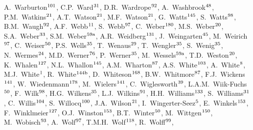 \begin{flushleft}
A.~Warburton$^\textrm{\scriptsize 101}$,    
C.P.~Ward$^\textrm{\scriptsize 31}$,    
D.R.~Wardrope$^\textrm{\scriptsize 92}$,    
A.~Washbrook$^\textrm{\scriptsize 48}$,    
P.M.~Watkins$^\textrm{\scriptsize 21}$,    
A.T.~Watson$^\textrm{\scriptsize 21}$,    
M.F.~Watson$^\textrm{\scriptsize 21}$,    
G.~Watts$^\textrm{\scriptsize 145}$,    
S.~Watts$^\textrm{\scriptsize 98}$,    
B.M.~Waugh$^\textrm{\scriptsize 92}$,    
A.F.~Webb$^\textrm{\scriptsize 11}$,    
S.~Webb$^\textrm{\scriptsize 97}$,    
C.~Weber$^\textrm{\scriptsize 180}$,    
M.S.~Weber$^\textrm{\scriptsize 20}$,    
S.A.~Weber$^\textrm{\scriptsize 33}$,    
S.M.~Weber$^\textrm{\scriptsize 59a}$,    
A.R.~Weidberg$^\textrm{\scriptsize 131}$,    
J.~Weingarten$^\textrm{\scriptsize 45}$,    
M.~Weirich$^\textrm{\scriptsize 97}$,    
C.~Weiser$^\textrm{\scriptsize 50}$,    
P.S.~Wells$^\textrm{\scriptsize 35}$,    
T.~Wenaus$^\textrm{\scriptsize 29}$,    
T.~Wengler$^\textrm{\scriptsize 35}$,    
S.~Wenig$^\textrm{\scriptsize 35}$,    
N.~Wermes$^\textrm{\scriptsize 24}$,    
M.D.~Werner$^\textrm{\scriptsize 76}$,    
P.~Werner$^\textrm{\scriptsize 35}$,    
M.~Wessels$^\textrm{\scriptsize 59a}$,    
T.D.~Weston$^\textrm{\scriptsize 20}$,    
K.~Whalen$^\textrm{\scriptsize 127}$,    
N.L.~Whallon$^\textrm{\scriptsize 145}$,    
A.M.~Wharton$^\textrm{\scriptsize 87}$,    
A.S.~White$^\textrm{\scriptsize 103}$,    
A.~White$^\textrm{\scriptsize 8}$,    
M.J.~White$^\textrm{\scriptsize 1}$,    
R.~White$^\textrm{\scriptsize 144b}$,    
D.~Whiteson$^\textrm{\scriptsize 168}$,    
B.W.~Whitmore$^\textrm{\scriptsize 87}$,    
F.J.~Wickens$^\textrm{\scriptsize 141}$,    
W.~Wiedenmann$^\textrm{\scriptsize 178}$,    
M.~Wielers$^\textrm{\scriptsize 141}$,    
C.~Wiglesworth$^\textrm{\scriptsize 39}$,    
L.A.M.~Wiik-Fuchs$^\textrm{\scriptsize 50}$,    
F.~Wilk$^\textrm{\scriptsize 98}$,    
H.G.~Wilkens$^\textrm{\scriptsize 35}$,    
L.J.~Wilkins$^\textrm{\scriptsize 91}$,    
H.H.~Williams$^\textrm{\scriptsize 133}$,    
S.~Williams$^\textrm{\scriptsize 31}$,    
C.~Willis$^\textrm{\scriptsize 104}$,    
S.~Willocq$^\textrm{\scriptsize 100}$,    
J.A.~Wilson$^\textrm{\scriptsize 21}$,    
I.~Wingerter-Seez$^\textrm{\scriptsize 5}$,    
E.~Winkels$^\textrm{\scriptsize 153}$,    
F.~Winklmeier$^\textrm{\scriptsize 127}$,    
O.J.~Winston$^\textrm{\scriptsize 153}$,    
B.T.~Winter$^\textrm{\scriptsize 50}$,    
M.~Wittgen$^\textrm{\scriptsize 150}$,    
M.~Wobisch$^\textrm{\scriptsize 93}$,    
A.~Wolf$^\textrm{\scriptsize 97}$,    
T.M.H.~Wolf$^\textrm{\scriptsize 118}$,    
R.~Wolff$^\textrm{\scriptsize 99}$,    

\end{flushleft}
